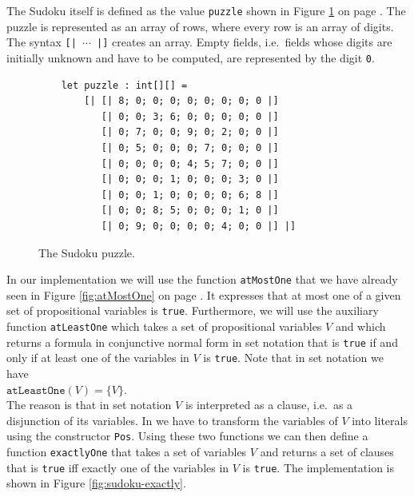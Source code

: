 The Sudoku itself is defined as the value \texttt{puzzle} shown in Figure
\ref{fig:sudoku-create-puzzle} on page \pageref{fig:sudoku-create-puzzle}.  The puzzle is
represented as an array of rows, where every row is an array of digits.  The syntax \texttt{[| $\cdots$ |]} creates an
array.  Empty fields, i.e.~fields whose digits are initially unknown and have to be computed, are represented by
the digit \texttt{0}.

\begin{figure}[!ht]
\centering
\begin{verbatim}
    let puzzle : int[][] =
        [| [| 8; 0; 0; 0; 0; 0; 0; 0; 0 |]
           [| 0; 0; 3; 6; 0; 0; 0; 0; 0 |]
           [| 0; 7; 0; 0; 9; 0; 2; 0; 0 |]
           [| 0; 5; 0; 0; 0; 7; 0; 0; 0 |]
           [| 0; 0; 0; 0; 4; 5; 7; 0; 0 |]
           [| 0; 0; 0; 1; 0; 0; 0; 3; 0 |]
           [| 0; 0; 1; 0; 0; 0; 0; 6; 8 |]
           [| 0; 0; 8; 5; 0; 0; 0; 1; 0 |]
           [| 0; 9; 0; 0; 0; 0; 4; 0; 0 |] |]
\end{verbatim}
\vspace*{-0.3cm}
\caption{The Sudoku puzzle.}
\label{fig:sudoku-create-puzzle}
\end{figure}

In our implementation we will use the function \texttt{atMostOne} that we have already seen in Figure
\ref{fig:atMostOne} on page \pageref{fig:atMostOne}.  It expresses that at most one of a given set of
propositional variables is \texttt{true}.  Furthermore, we will use the auxiliary function
\texttt{atLeastOne} which takes a set of propositional variables $V$ and which returns a formula in
conjunctive normal form in set notation that is \texttt{true} if and only if at least one of the variables in
$V$ is \texttt{true}.  Note that in set notation we have
\\[0.2cm]
\hspace*{1.3cm}
$\texttt{atLeastOne}(V) = \bigl\{ V \bigr\}$.
\\[0.2cm]
The reason is that in set notation  $V$ is interpreted as a clause, i.e.~as a disjunction of its variables.
In \Fsharp{} we have to transform the variables of $V$ into literals using the constructor \texttt{Pos}.
Using these two functions we can then define a function \texttt{exactlyOne} that
takes a set of variables $V$ and returns a set of clauses that is \texttt{true} iff exactly one of the variables
in $V$ is \texttt{true}.  The implementation is shown in Figure \ref{fig:sudoku-exactly}.

